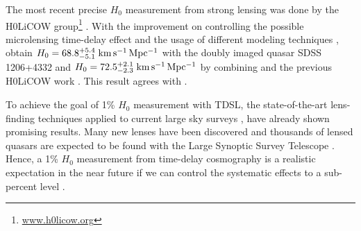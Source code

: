 \documentclass[useAMS,usenatbib]{mnras}
\newcommand\rxj{RXJ\,1131$-$1231}
\newcommand\he{HE\,0435$-$1223}
\newcommand\bb{B\,1608$+$656}
\def\kmsmpc{\rm km\,s^{-1}\,Mpc^{-1}}
\begin{document}
The most recent precise $H_{0}$ measurement from strong lensing was done by the H0LiCOW group\footnote{\url{www.h0licow.org}} %
\citep[H0 Lenses in COSMOGRAIL’s Wellspring,][]{suyuEtal17}. With the improvement on controlling the possible microlensing time-delay effect \citep{TieKochanek18,GChenEtal18a} and the usage of different modeling techniques \citep{BirrerEtal15,BirrerAmara18}, \citet{BirrerEtal18} obtain $H_{0}=68.8\substack{+5.4\\-5.1}~\kmsmpc$ with the doubly imaged quasar SDSS 1206+4332 and $H_{0}=72.5\substack{+2.1\\-2.3}~\kmsmpc$ by combining \citet{FassnachtEtal02} and the previous H0LiCOW work \citep{SuyuEtal09,SuyuEtal10,SuyuEtal13,SuyuEtal14,SluseEtal17,RusuEtal17,WongEtal17,BonvinEtal17}. This result agrees with \citet{RiessEtal18c}.


To achieve the goal of 1\% $H_{0}$ measurement with TDSL, the state-of-the-art lens-finding techniques applied to current large sky surveys \citep[e.g.][]{JosephEtal14,AvestruzEtal17,Agnello17,PetrilloEtal17,OstrovskiEtal17,LanusseEtal18}, have already shown promising results. Many new lenses have been discovered \citep[e.g.,][]{LinEtal17,AgnelloEtal17, SchechterEtal17,OstrovskiEtal18,WilliamEtal18,RusuEtal18,LemonEtal19,DelchambreEtal19} and thousands of lensed quasars are expected to be found with the Large Synoptic Survey Telescope \citep{OguriMarshall10}.
Hence, a 1\% $H_{0}$ measurement from time-delay cosmography is a realistic expectation in the near future \citep[e.g.,][Jee et al. 2018 submitted]{JeeEtal15,JeeEtal16,deGrijsEtal17,SuyuEtal18,ShajibEtal18} if we can control the systematic effects to a sub-percent level \citep[][]{DoblerEtal13,LiaoEtal15,DingEtal18}.
\end{document}
